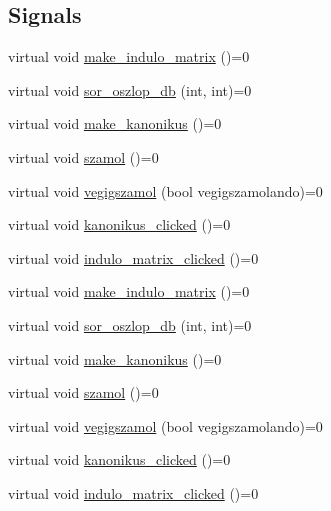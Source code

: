 \subsection*{Signals}
\begin{DoxyCompactItemize}
\item 
virtual void \hyperlink{classMainwindow__Gui__Plugin__Interface_a6f6ad76f05dee7b337e2a92e517f059f}{make\+\_\+indulo\+\_\+matrix} ()=0
\item 
virtual void \hyperlink{classMainwindow__Gui__Plugin__Interface_ac9422e891b27c71e494d8e48b85fd2dd}{sor\+\_\+oszlop\+\_\+db} (int, int)=0
\item 
virtual void \hyperlink{classMainwindow__Gui__Plugin__Interface_a001c5676bdc263a8f305bb48edfc30c4}{make\+\_\+kanonikus} ()=0
\item 
virtual void \hyperlink{classMainwindow__Gui__Plugin__Interface_aca2e7efeb264c5555dd4ae21bdba009b}{szamol} ()=0
\item 
virtual void \hyperlink{classMainwindow__Gui__Plugin__Interface_a5ef9f7b5d5befab0f74eccefe9313062}{vegigszamol} (bool vegigszamolando)=0
\item 
virtual void \hyperlink{classMainwindow__Gui__Plugin__Interface_a2899609024d5d23915810d1814dfe819}{kanonikus\+\_\+clicked} ()=0
\item 
virtual void \hyperlink{classMainwindow__Gui__Plugin__Interface_a82bc683c6515109f47d75337ff17dd53}{indulo\+\_\+matrix\+\_\+clicked} ()=0
\item 
virtual void \hyperlink{classMainwindow__Gui__Plugin__Interface_a6f6ad76f05dee7b337e2a92e517f059f}{make\+\_\+indulo\+\_\+matrix} ()=0
\item 
virtual void \hyperlink{classMainwindow__Gui__Plugin__Interface_ac9422e891b27c71e494d8e48b85fd2dd}{sor\+\_\+oszlop\+\_\+db} (int, int)=0
\item 
virtual void \hyperlink{classMainwindow__Gui__Plugin__Interface_a001c5676bdc263a8f305bb48edfc30c4}{make\+\_\+kanonikus} ()=0
\item 
virtual void \hyperlink{classMainwindow__Gui__Plugin__Interface_aca2e7efeb264c5555dd4ae21bdba009b}{szamol} ()=0
\item 
virtual void \hyperlink{classMainwindow__Gui__Plugin__Interface_a5ef9f7b5d5befab0f74eccefe9313062}{vegigszamol} (bool vegigszamolando)=0
\item 
virtual void \hyperlink{classMainwindow__Gui__Plugin__Interface_a2899609024d5d23915810d1814dfe819}{kanonikus\+\_\+clicked} ()=0
\item 
virtual void \hyperlink{classMainwindow__Gui__Plugin__Interface_a82bc683c6515109f47d75337ff17dd53}{indulo\+\_\+matrix\+\_\+clicked} ()=0

\end{DoxyCompactItemize}
